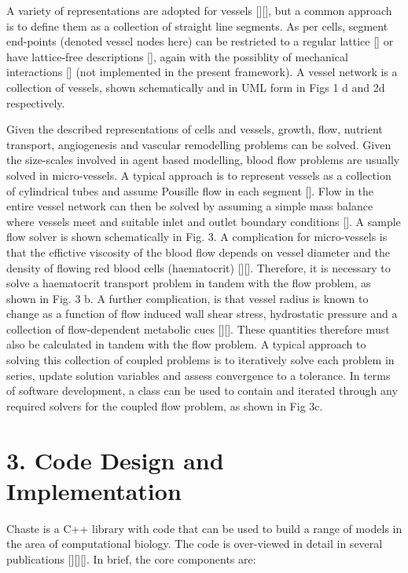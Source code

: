 \documentclass[superscriptaddress, a4paper]{article}
\begin{document}
A variety of representations are adopted for vessels [][], but a common approach is to define them as a collection of straight line segments. As per cells, segment end-points (denoted vessel nodes here) can be restricted to a regular lattice [] or have lattice-free descriptions [], again with the possiblity of mechanical interactions [] (not implemented in the present framework). A vessel network is a collection of vessels, shown schematically and in UML form in Figs 1 d and 2d respectively. 

Given the described representations of cells and vessels, growth, flow, nutrient transport, angiogenesis and vascular remodelling problems can be solved. Given the size-scales involved in agent based modelling, blood flow problems are usually solved in micro-vessels. A typical approach is to represent vessels as a collection of cylindrical tubes and assume Pousille flow in each segment []. Flow in the entire vessel network can then be solved by assuming a simple mass balance where vessels meet and suitable inlet and outlet boundary conditions []. A sample flow solver is shown schematically in Fig. 3. A complication for micro-vessels is that the effictive viscosity of the blood flow depends on vessel diameter and the density of flowing red blood cells (haematocrit) [][]. Therefore, it is necessary to solve a haematocrit transport problem in tandem with the flow problem, as shown in Fig. 3 b. A further complication, is that vessel radius is known to change as a function of flow induced wall shear stress, hydrostatic pressure and a collection of flow-dependent metabolic cues [][]. These quantities therefore must also be calculated in tandem with the flow problem. A typical approach to solving this collection of coupled problems is to iteratively solve each problem in series, update solution variables and assess convergence to a tolerance. In terms of software development, a class can be used to contain and iterated through any required solvers for the coupled flow problem, as shown in Fig 3c.










\section{3. Code Design and Implementation}
\label{sec:design and implementation}

Chaste is a C++ library with code that can be used to build a range of models in the area of computational biology. The code is over-viewed in detail in several publications [][][]. In brief, the core components are:
\end{document}

